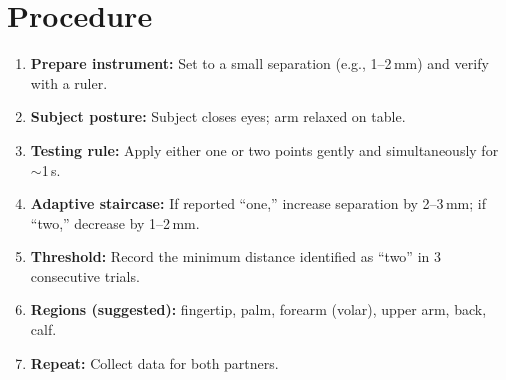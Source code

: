 \section{Procedure}
\begin{enumerate}[leftmargin=*]
  \item \textbf{Prepare instrument:} Set to a small separation (e.g., 1–2\,mm) and verify with a ruler.
  \item \textbf{Subject posture:} Subject closes eyes; arm relaxed on table.
  \item \textbf{Testing rule:} Apply either one or two points gently and simultaneously for $\sim$1\,s.
  \item \textbf{Adaptive staircase:} If reported “one,” increase separation by 2–3\,mm; if “two,” decrease by 1–2\,mm.
  \item \textbf{Threshold:} Record the minimum distance identified as “two” in 3 consecutive trials.
  \item \textbf{Regions (suggested):} fingertip, palm, forearm (volar), upper arm, back, calf.
  \item \textbf{Repeat:} Collect data for both partners.
\end{enumerate}
